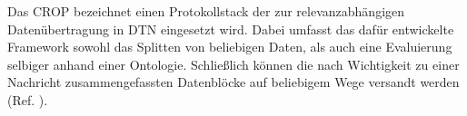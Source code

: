 Das \gls{CROP} bezeichnet einen Protokollstack der zur relevanzabh{\"a}ngigen
Daten{\"u}bertragung in \gls{DTN} eingesetzt wird. Dabei
umfasst das daf{\"u}r entwickelte Framework sowohl das Splitten von beliebigen Daten, als auch eine Evaluierung selbiger anhand einer
Ontologie. Schlie{\ss}lich k{\"o}nnen die nach Wichtigkeit zu einer Nachricht
zusammengefassten Datenbl{\"o}cke auf beliebigem Wege versandt werden (Ref.
\cite{Daher}).
